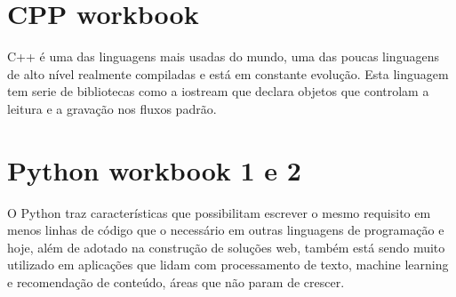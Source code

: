  \section{CPP workbook}
 C++ é uma das linguagens mais usadas do mundo, uma das poucas linguagens de alto nível realmente compiladas e está em constante evolução.
 Esta linguagem tem serie de bibliotecas como a iostream que declara objetos que controlam a leitura e a gravação nos fluxos padrão. 
 \section{Python workbook 1 e 2}
 O Python traz características que possibilitam escrever o mesmo requisito em menos linhas de código que o necessário em outras linguagens de programação e hoje, além de adotado na construção de soluções web, também está sendo muito utilizado em aplicações que lidam com processamento de texto, machine learning e recomendação de conteúdo, áreas que não param de crescer.\cite{Python}






